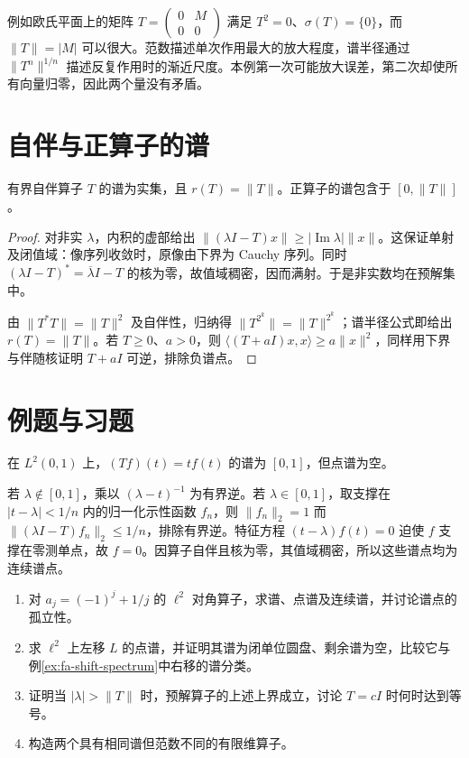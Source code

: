 例如欧氏平面上的矩阵 $T=\begin{pmatrix}0&M\\0&0\end{pmatrix}$ 满足 $T^2=0$、$\sigma(T)=\{0\}$，而 $\|T\|=|M|$ 可以很大。范数描述单次作用最大的放大程度，谱半径通过 $\|T^n\|^{1/n}$ 描述反复作用时的渐近尺度。本例第一次可能放大误差，第二次却使所有向量归零，因此两个量没有矛盾。

\section{自伴与正算子的谱}
\begin{proposition}\label{prop:fa-selfadjoint-spectrum}
有界自伴算子 $T$ 的谱为实集，且 $r(T)=\|T\|$。正算子的谱包含于 $[0,\|T\|]$。
\end{proposition}
\begin{proof}
对非实 $\lambda$，内积的虚部给出 $\|(\lambda I-T)x\|\geq|\operatorname{Im}\lambda|\|x\|$。这保证单射及闭值域：像序列收敛时，原像由下界为 Cauchy 序列。同时 $(\lambda I-T)^*=\overline\lambda I-T$ 的核为零，故值域稠密，因而满射。于是非实数均在预解集中。

由 $\|T^*T\|=\|T\|^2$ 及自伴性，归纳得 $\|T^{2^k}\|=\|T\|^{2^k}$；谱半径公式即给出 $r(T)=\|T\|$。若 $T\geq0$、$a>0$，则 $\langle(T+aI)x,x\rangle\geq a\|x\|^2$，同样用下界与伴随核证明 $T+aI$ 可逆，排除负谱点。
\end{proof}

\section{例题与习题}
\begin{example}[谱点不必是特征值]\label{ex:fa-multiplication-spectrum}
在 $L^2(0,1)$ 上，$(Tf)(t)=tf(t)$ 的谱为 $[0,1]$，但点谱为空。
\end{example}
\begin{solve}
若 $\lambda\notin[0,1]$，乘以 $(\lambda-t)^{-1}$ 为有界逆。若 $\lambda\in[0,1]$，取支撑在 $|t-\lambda|<1/n$ 内的归一化示性函数 $f_n$，则 $\|f_n\|_2=1$ 而 $\|(\lambda I-T)f_n\|_2\leq1/n$，排除有界逆。特征方程 $(t-\lambda)f(t)=0$ 迫使 $f$ 支撑在零测单点，故 $f=0$。因算子自伴且核为零，其值域稠密，所以这些谱点均为连续谱点。
\end{solve}
\begin{enumerate}
 \item 对 $a_j=(-1)^j+1/j$ 的 $\ell^2$ 对角算子，求谱、点谱及连续谱，并讨论谱点的孤立性。
 \item 求 $\ell^2$ 上左移 $L$ 的点谱，并证明其谱为闭单位圆盘、剩余谱为空，比较它与例\ref{ex:fa-shift-spectrum}中右移的谱分类。
 \item 证明当 $|\lambda|>\|T\|$ 时，预解算子的上述上界成立，讨论 $T=cI$ 时何时达到等号。
 \item 构造两个具有相同谱但范数不同的有限维算子。
\end{enumerate}

